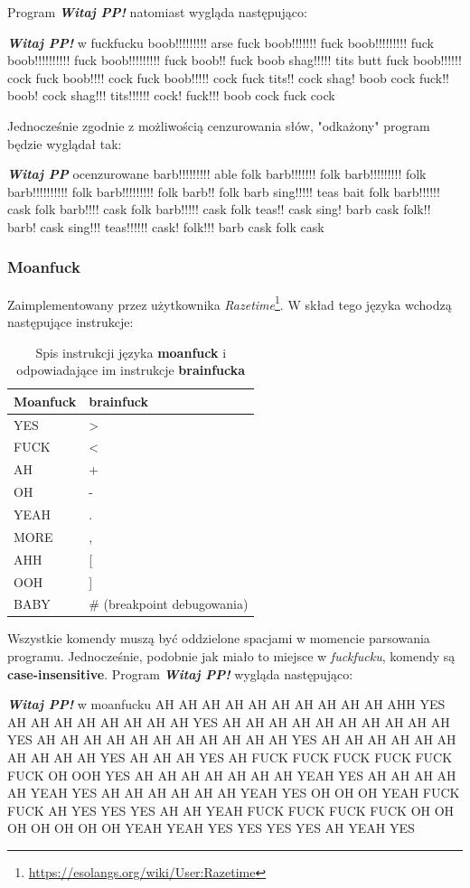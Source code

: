 \documentclass[fleqn,10pt]{SelfArx} %
\newcommand{\tabline}{\tabularnewline\hline}
\begin{document}
Program \textbf{\textit{Witaj PP!}} natomiast wygląda następująco:
\begin{sexylisting}{\textbf{\textit{Witaj PP!}} w fuckfucku}
boob!!!!!!!!! arse fuck boob!!!!!!! 
fuck boob!!!!!!!!! fuck boob!!!!!!!!!! 
fuck boob!!!!!!!!! fuck boob!! fuck 
boob shag!!!!! tits butt fuck 
boob!!!!!! cock fuck boob!!!! cock 
fuck boob!!!!! cock fuck tits!! cock 
shag! boob cock fuck!! boob! cock 
shag!!! tits!!!!!! cock! fuck!!!
boob cock fuck cock
\end{sexylisting}

\par Jednocześnie zgodnie z możliwością cenzurowania słów, "odkażony" program będzie wyglądał tak:
\begin{sexylisting}{\textbf{\textit{Witaj PP}} ocenzurowane}
barb!!!!!!!!! able folk barb!!!!!!! 
folk barb!!!!!!!!! folk barb!!!!!!!!!! 
folk barb!!!!!!!!! folk barb!! folk 
barb sing!!!!! teas bait folk 
barb!!!!!! cask folk barb!!!! cask 
folk barb!!!!! cask folk teas!! cask 
sing! barb cask folk!! barb! cask 
sing!!! teas!!!!!! cask! folk!!!
barb cask folk cask
\end{sexylisting}

\subsubsection{Moanfuck}
Zaimplementowany przez użytkownika \textit{Razetime}\footnote{\url{https://esolangs.org/wiki/User:Razetime}}.
W skład tego języka wchodzą następujące instrukcje\cite{esolangWiki:moanfuck}:
\begin{table}[H]
	\begin{center}
		\begin{tabular}{| >{\centering}p{1.5cm} | >{\centering}p{4cm}|}
			\hline
			\textbf{Moanfuck} & \textbf{brainfuck} \tabline
			YES & > \tabline
			FUCK & < \tabline
			AH & + \tabline
			OH & - \tabline
			YEAH & . \tabline
			MORE & , \tabline
			AHH & [ \tabline
			OOH & ] \tabline
			BABY & \# (breakpoint debugowania) \tabline
		\end{tabular}
	\end{center}
	\caption{\centering Spis instrukcji języka \textbf{moanfuck} i odpowiadające im instrukcje \textbf{brainfucka}}
	\label{tab:moanfuckInstrukcje}
\end{table}

\par Wszystkie komendy muszą być oddzielone spacjami w momencie parsowania programu. Jednocześnie, podobnie jak miało to miejsce w \textit{fuckfucku},
komendy są \textbf{case-insensitive}.
Program \textbf{\textit{Witaj PP!}} wygląda następująco:
\begin{sexylisting}{\textbf{\textit{Witaj PP!}} w moanfucku}
AH AH AH AH AH AH AH AH AH AH AHH
YES AH AH AH AH AH AH AH AH YES
AH AH AH AH AH AH AH AH AH AH YES
AH AH AH AH AH AH AH AH AH AH AH
YES AH AH AH AH AH AH AH AH AH AH
YES AH AH AH YES AH FUCK FUCK
FUCK FUCK FUCK FUCK OH OOH YES
AH AH AH AH AH AH AH YEAH YES
AH AH AH AH AH YEAH YES AH AH AH
AH AH AH YEAH YES OH OH OH YEAH
FUCK FUCK AH YES YES YES AH AH
YEAH FUCK FUCK FUCK FUCK OH OH
OH OH OH OH OH YEAH YEAH YES YES
YES YES AH YEAH YES
\end{sexylisting}
\end{document}
